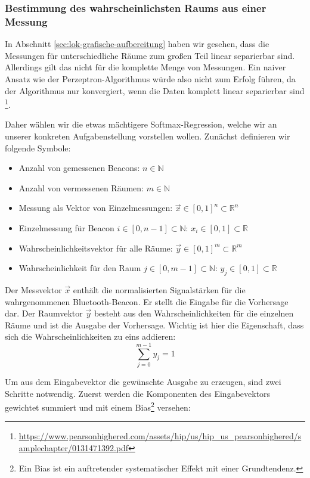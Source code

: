 \subsubsection{Bestimmung des wahrscheinlichsten Raums aus einer Messung}
\label{sec:lok-wahrscheinlich}

In Abschnitt \ref{sec:lok-grafische-aufbereitung} haben wir gesehen, dass die
Messungen für unterschiedliche Räume zum großen Teil linear separierbar sind.
Allerdings gilt das nicht für die komplette Menge von Messungen.
Ein naiver Ansatz wie der Perzeptron-Algorithmus würde also nicht zum Erfolg
führen, da der Algorithmus nur konvergiert, wenn die Daten komplett linear
separierbar sind
\footnote{\url{https://www.pearsonhighered.com/assets/hip/us/hip_us_pearsonhighered/samplechapter/0131471392.pdf}}.

Daher wählen wir die etwas mächtigere Softmax-Regression, welche wir an unserer
konkreten Aufgabenstellung vorstellen wollen.
Zunächst definieren wir folgende Symbole:
\begin{itemize}
	\item Anzahl von gemessenen Beacons: $n \in \mathbb{N}$
	\item Anzahl von vermessenen Räumen: $m \in \mathbb{N}$
	\item Messung als Vektor von Einzelmessungen: $ \vec{x} \in [0, 1]^n \subset \mathbb{R}^n $
	\item Einzelmessung für Beacon $i \in [0, n - 1] \subset \mathbb{N}$: $x_i \in [0, 1] \subset \mathbb{R}$
	\item Wahrscheinlichkeitsvektor für alle Räume: $ \vec{y} \in [0, 1]^m \subset \mathbb{R}^m$
	\item Wahrscheinlichkeit für den Raum $j \in [0, m - 1] \subset \mathbb{N}$:
		$ y_j \in [0, 1] \subset \mathbb{R} $ 
\end{itemize}

Der Messvektor $\vec{x}$ enthält die normalisierten Signalstärken für die wahrgenommenen
Bluetooth-Beacon. Er stellt die Eingabe für die Vorhersage dar. 
Der Raumvektor $\vec{y}$ besteht aus den Wahrscheinlichkeiten für die einzelnen Räume und
ist die Ausgabe der Vorhersage. Wichtig ist hier die Eigenschaft, dass sich die Wahrscheinlichkeiten
zu eins addieren:
$$ \sum_{j=0}^{m-1} y_j = 1 $$

Um aus dem Eingabevektor die gewünschte Ausgabe zu erzeugen, sind zwei Schritte notwendig.
Zuerst werden die Komponenten des Eingabevektors gewichtet summiert und mit einem Bias\footnote{Ein Bias ist ein auftretender systematischer Effekt mit einer Grundtendenz.}
versehen:

